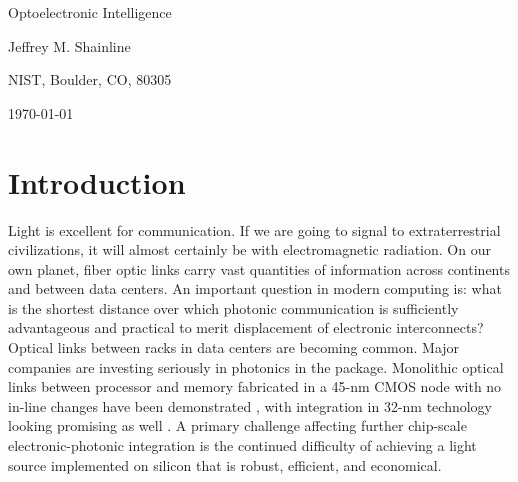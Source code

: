 \documentclass[twocolumn]{article}
\begin{document}
	
	\centerline{\LARGE Optoelectronic Intelligence}%
	\vspace{0.75em}
	\centerline{\Large Jeffrey M. Shainline}
	\vspace{0.5em}
	\centerline{\large NIST, Boulder, CO, 80305}
	\vspace{0.5em}
	\centerline{\large \today}

	
	
	
\begin{abstract}

\end{abstract}


\section{\label{sec:introduction}Introduction}
Light is excellent for communication. If we are going to signal to extraterrestrial civilizations, it will almost certainly be with electromagnetic radiation. On our own planet, fiber optic links carry vast quantities of information across continents and between data centers. An important question in modern computing is: what is the shortest distance over which photonic communication is sufficiently advantageous and practical to merit displacement of electronic interconnects? Optical links between racks in data centers are becoming common. Major companies are investing seriously in photonics in the package. Monolithic optical links between processor and memory fabricated in a 45-nm CMOS node with no in-line changes have been demonstrated \cite{suwa2015}, with integration in 32-nm technology looking promising as well \cite{stra2018}. A primary challenge affecting further chip-scale electronic-photonic integration is the continued difficulty of achieving a light source implemented on silicon that is robust, efficient, and economical.
\end{document}
